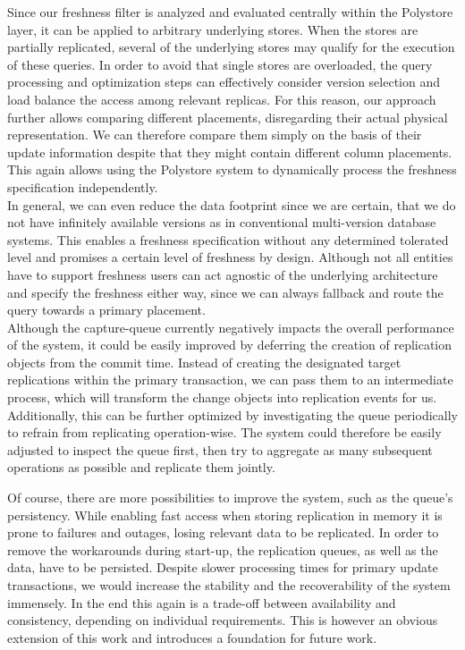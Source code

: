 Since our freshness filter is analyzed and evaluated centrally within the Polystore layer, it can be applied to arbitrary underlying stores.
When the stores are partially replicated, several of the underlying stores may qualify for the execution of these queries. 
In order to avoid that single stores are overloaded, the query processing and optimization steps
can effectively consider version selection and load balance the access among relevant replicas.
For this reason, our approach further allows comparing different placements, disregarding their actual physical representation. We can therefore compare them simply on the basis of their
update information despite that they might contain different column placements. 
This again allows using the Polystore system to dynamically process the freshness specification independently.\\
In general, we can even reduce the data footprint since we are certain, that we do not have infinitely available versions as in conventional multi-version database systems.
This enables a freshness specification without any determined tolerated level and promises a certain level of freshness by design.
Although not all entities have to support freshness users can act agnostic of the underlying architecture and specify the freshness either way, 
since we can always fallback and route the query towards a primary placement.\\







Although the capture-queue currently negatively  impacts the overall performance of the system,
it could be easily improved by deferring the creation of replication objects from the commit time.
Instead of creating the designated target replications within the primary transaction, we can pass them to an intermediate process, 
which will transform the change objects into replication events for us.
Additionally, this can be further optimized by investigating the queue periodically to refrain from replicating operation-wise.
The system could therefore be easily adjusted to inspect the queue first, then try to aggregate as many subsequent operations as possible
and replicate them jointly.



Of course, there are more possibilities to improve the system, such as the queue's persistency. While enabling fast access when storing replication in memory it is prone to 
failures and outages, losing relevant data to be replicated. In order to remove the workarounds during start-up, the replication queues, as well as the data, have 
to be persisted. Despite slower processing times for primary update transactions, we would increase the stability and the recoverability  of the system immensely.
In the end this again is a trade-off between availability and consistency, depending on individual requirements.
This is however an obvious extension of this work and introduces a foundation for future work.



